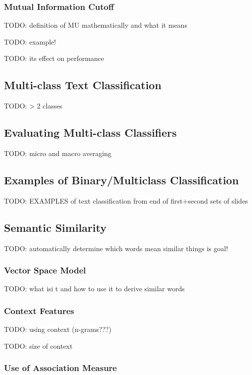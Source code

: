 \documentclass{article}
\begin{document}
\subsubsection{Mutual Information Cutoff}

TODO: definition of MU mathematically and what it means

TODO: example!

TODO: its effect on performance

\subsection{Multi-class Text Classification}

TODO: > 2 classes

\subsection{Evaluating Multi-class Classifiers}

TODO: micro and macro averaging

\subsection{Examples of Binary/Multiclass Classification}

TODO: EXAMPLES of text classification from end of first+second sets of slides

\subsection{Semantic Similarity}

TODO: automatically determine which words mean similar things is goal!

\subsubsection{Vector Space Model}

TODO: what isi t and how to use it to derive similar words

\subsubsection{Context Features}

TODO: using context (n-grams???)

TODO: size of context

\subsubsection{Use of Association Measure}
\end{document}
